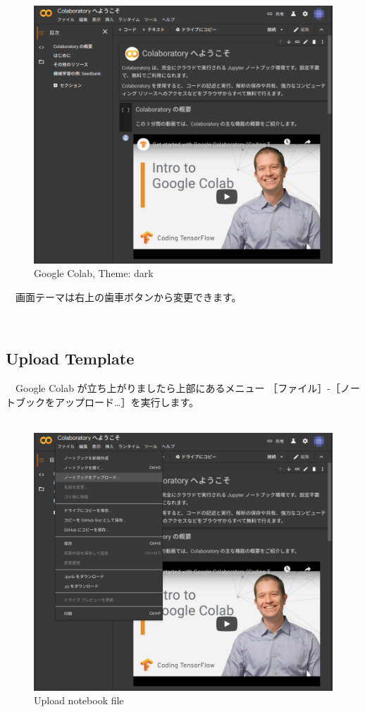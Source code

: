 \documentclass[
  12pt,
]{book}
\begin{document}
\begin{figure}[H]

{\centering \includegraphics[width=0.8\linewidth,]{fig/Colab/welcome} 

}

\caption{Google Colab, Theme: dark}\label{fig:unnamed-chunk-135}
\end{figure}

　画面テーマは右上の歯車ボタンから変更できます。

　

\hypertarget{upload-template}{%
\subsection{Upload Template}\label{upload-template}}

　Google Colab が立ち上がりましたら上部にあるメニュー ［ファイル］-［ノートブックをアップロード\ldots］を実行します。\\
　

\begin{figure}[H]

{\centering \includegraphics[width=0.8\linewidth,]{fig/Colab/upload_notebook} 

}

\caption{Upload notebook file}\label{fig:unnamed-chunk-136}
\end{figure}
\end{document}

